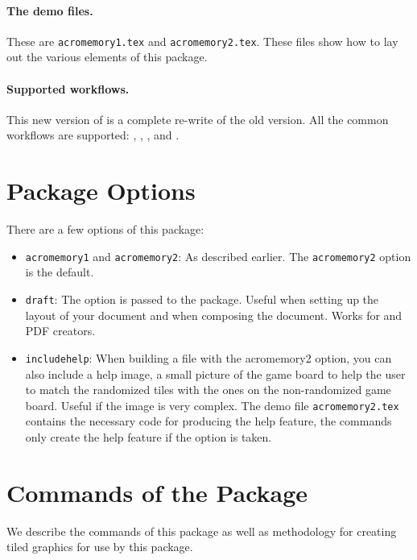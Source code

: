 \documentclass{article}
\begin{document}
\paragraph*{The demo files.} These are \texttt{acromemory1.tex} and
\texttt{acromemory2.tex}. These files show how to lay out the
various elements of this package.

\paragraph*{Supported workflows.} This new version of  is a complete
re-write of the old version. All the common workflows are supported: ,
, , and .

\section{Package Options}

There are a few options of this package:
\begin{itemize}
    \item \texttt{acromemory1} and \texttt{acromemory2}: As described
        earlier. The \texttt{acromemory2} option is the default.

    \item \texttt{draft}: The  option is passed to the
         package. Useful when setting up the layout of your
        document and when composing the document. Works for 
        and  PDF creators.

    \item \texttt{includehelp}: When building a file with the acromemory2
        option, you can also include a help image, a small picture of the
        game board to help the user to match the randomized tiles with the
        ones on the non-randomized game board. Useful if the image is very
        complex. The demo file \texttt{acromemory2.tex} contains the
        necessary code for producing the help feature, the commands only
        create the help feature if the  option is taken.
\end{itemize}

\section{Commands of the Package}

We describe the commands of this package as well as methodology for creating
tiled graphics for use by this package.
\end{document}
